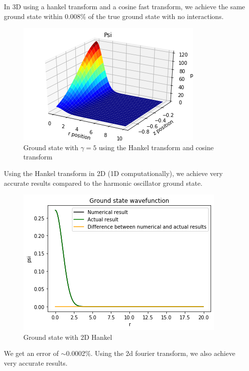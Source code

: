 \documentclass[10pt]{article}
\numberwithin{equation}{section}
\begin{document}
\begin{multicols}{2}
In 3D using a hankel transform and a cosine fast transform, we achieve the same ground state within $0.008\%$ of the true ground state with no interactions.

\begin{figure}[H]
\centering
\includegraphics[width=0.8\linewidth]{gndstate3DHankel}
\caption{Ground state with $\gamma=5$ using the Hankel transform and cosine transform}
\end{figure}
	
Using the Hankel transform in 2D (1D computationally), we achieve very accurate results compared to the harmonic oscillator ground state.
\begin{figure}[H]
\centering
\includegraphics[width=\linewidth]{hankel 2d gnd state}
\caption{Ground state with 2D Hankel}
\end{figure}
We get an error of $\sim$0.0002\%.
Using the 2d fourier transform, we also achieve very accurate results.


\end{multicols}
\end{document}
